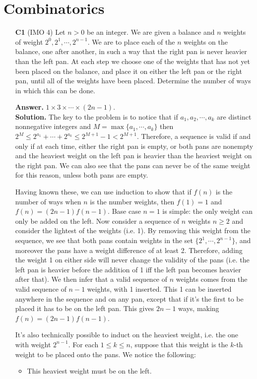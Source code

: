 \documentclass[11pt,a4paper]{article}
\begin{document}
\section*{Combinatorics}
\begin{enumerate}
	\item [\textbf{C1}] (IMO 4) Let $n > 0$ be an integer. We are given a balance and $n$ weights of weight $2^0, 2^1, \cdots, 2^{n-1}$. We are to place each of the $n$ weights on the balance, one after another, in such a way that the right pan is never heavier than the left pan. At each step we choose one of the weights that has not yet been placed on the balance, and place it on either the left pan or the right pan, until all of the weights have been placed.
	Determine the number of ways in which this can be done.
	
	\textbf{Answer.} $1\times 3 \times \cdots \times (2n-1)$. \\
	\textbf{Solution.} The key to the problem is to notice that if $a_1, a_2, \cdots , a_k$ are distinct nonnegative integers and $M=\max\{a_1, \cdots , a_k\}$ then $2^{M}\le 2^{a_1}+\cdots + 2^{a_k}\le 2^{M+1}-1<2^{M+1}$. 
	Therefore, a sequence is valid if and only if at each time, either the right pan is empty, or both pans are nonempty and the heaviest weight on the left pan is heavier than the heaviest weight on the right pan.
	We can also see that the pans can never be of the same weight for this reason, unless both pans are empty. 
	
	Having known these, we can use induction to show that if $f(n)$ is the number of ways when $n$ is the number weights, then $f(1)=1$ and $f(n)=(2n-1)f(n-1)$. 
	Base case $n=1$ is simple: the only weight can only be added on the left. 
	Now consider a sequence of $n$ weights $n\ge 2$ and consider the lightest of the weights (i.e. 1). By removing this weight from the sequence, we see that both pans contain weights in the set $\{2^1, \cdots , 2^{n-1}\}$, and moreover the pans have a weight difference of at least 2. Therefore, adding the weight 1 on either side will never change the validity of the pans (i.e. the left pan is heavier before the addition of 1 iff the left pan becomes heavier after that). 
	We then infer that a valid sequence of $n$ weights comes from the valid sequence of $n - 1$ weights, with 1 inserted. This 1 can be inserted anywhere in the sequence and on any pan, except that if it's the first to be placed it has to be on the left pan. This gives $2n-1$ ways, making $f(n)=(2n-1)f(n-1)$. 
	
	It's also technically possible to induct on the heaviest weight, i.e. the one with weight $2^{n-1}$. 
	For each $1\le k\le n$, suppose that this weight is the $k$-th weight to be placed onto the pans. We notice the following: 
	\begin{itemize}
		\item This heaviest weight must be on the left. 
		

\end{itemize}
\end{enumerate}
\end{document}

